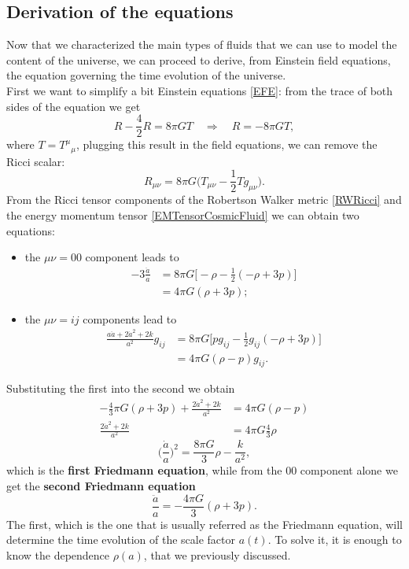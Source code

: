 \subsection{Derivation of the equations}
Now that we characterized the main types of fluids that we can use to model the content of the universe, we can proceed to derive, from Einstein field equations, the equation governing the time evolution of the universe.\\
First we want to simplify a bit Einstein equations \eqref{EFE}: from the trace of both sides of the equation we get
\begin{equation}
    R-\frac{4}{2}R=8\pi GT\quad\Rightarrow\quad R=-8\pi GT,
\end{equation}
where $T=T^\mu\phantom{}_\mu$, plugging this result in the field equations, we can remove the Ricci scalar:\begin{equation}
    R_{\mu\nu}=8\pi G\bigg(T_{\mu\nu}-\frac{1}{2}Tg_{\mu\nu}\bigg).
\end{equation}
From the Ricci tensor components of the Robertson Walker metric \eqref{RWRicci} and the energy momentum tensor \eqref{EMTensorCosmicFluid} we can obtain two equations:
\begin{itemize}
    \item the $\mu\nu=00$ component leads to
    \begin{align*}
        -3\frac{\ddot a}{a}&=8\pi G\bigg[-\rho-\frac{1}{2}(-\rho+3p)\bigg]\\&=4\pi G(\rho+3p);
    \end{align*}
    \item the $\mu\nu=ij$ components lead to
    \begin{align*}
        \frac{a\ddot a+2\dot a^2+2k}{a^2}g_{ij}&=8\pi G\bigg[pg_{ij}-\frac{1}{2}g_{ij}(-\rho+3p)\bigg]\\&=4\pi G(\rho-p)g_{ij}.
    \end{align*}
\end{itemize}
Substituting the first into the second we obtain
\begin{align}
   -\frac{4}{3}\pi G(\rho+3p) +\frac{2\dot a^2+2k}{a^2}&=4\pi G(\rho-p)\nonumber\\\frac{2\dot a^2+2k}{a^2}&=4\pi G\frac{4}{3}\rho\nonumber
\end{align}
\begin{equation}
    \boxed{\bigg(\frac{\dot a }{a}\bigg)^2=\frac{8\pi G}{3}\rho-\frac{k}{a^2}}\label{Friedmann1},
\end{equation}
which is the \textbf{first Friedmann equation}, while from the $00$ component alone we get the \textbf{second Friedmann equation}
\begin{equation}
    \label{Friedmann2}\boxed{\frac{\ddot a}{a}=-\frac{4\pi G}{3}(\rho+3p)}.
\end{equation}
The first, which is the one that is usually referred as the Friedmann equation, will determine the time evolution of the scale factor $a(t)$. To solve it, it is enough to know the dependence $\rho(a)$, that we previously discussed.
